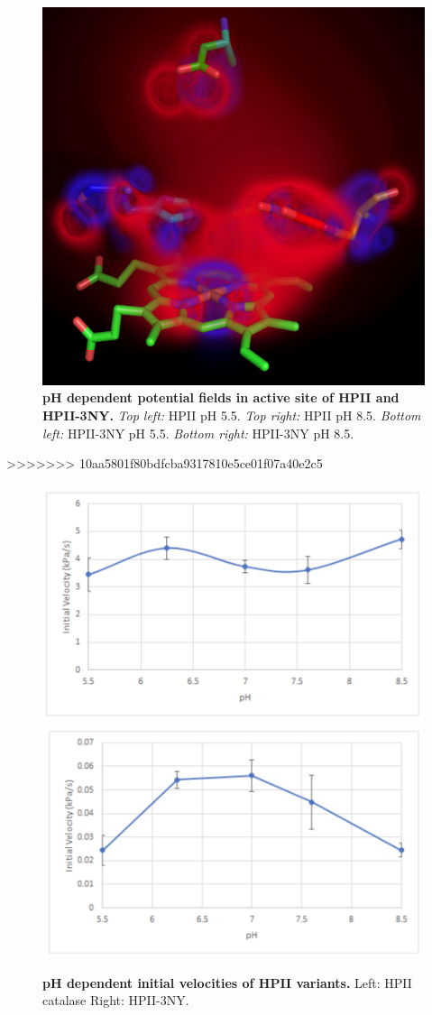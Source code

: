 \documentclass[9pt,twocolumn,twoside]{pnas-new}
\begin{document}
\begin{figure}
  \includegraphics[width=0.49\linewidth]{figures/apbs-3ny-ph8.png}
  \caption{\textbf{pH dependent potential fields in active site of HPII and HPII-3NY.} \textit{Top left:} HPII pH 5.5. \textit{Top right:} HPII pH 8.5. \textit{Bottom left:} HPII-3NY pH 5.5. \textit{Bottom right:} HPII-3NY pH 8.5. }
  \label{fig:apbs}
\end{figure}
>>>>>>> 10aa5801f80bdfcba9317810e5ce01f07a40e2c5


\begin{figure}
  \centering
  \includegraphics[width=0.9\linewidth]{figures/wildtype-velocity.png}
  \includegraphics[width=0.9\linewidth]{figures/3ny-velocity.png}
  \caption{\textbf{pH dependent initial velocities of HPII variants.} Left: HPII catalase Right: HPII-3NY.}
  \label{fig:ph-dependent-velocities}
\end{figure}
\end{document}
